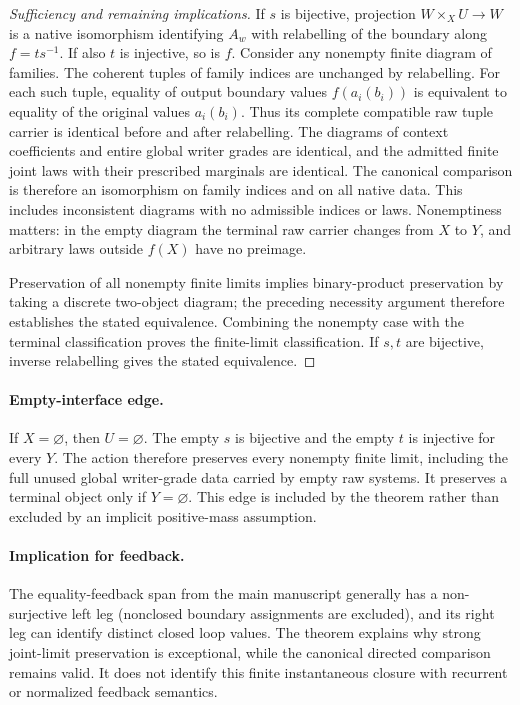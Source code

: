 \documentclass{article}
\begin{document}
\begin{proof}[Sufficiency and remaining implications]
If $s$ is bijective, projection $W\times_XU\to W$ is a native isomorphism
identifying $A_w$ with relabelling of the boundary along $f=ts^{-1}$. If also
$t$ is injective, so is $f$. Consider any nonempty finite diagram of families.
The coherent tuples of family indices are unchanged by relabelling. For each
such tuple, equality of output boundary values $f(a_i(b_i))$ is equivalent
to equality of the original values $a_i(b_i)$. Thus its complete compatible
raw tuple carrier is identical before and after relabelling. The diagrams of
context coefficients and entire global writer grades are identical, and the
admitted finite joint laws with their prescribed marginals are identical.
The canonical comparison is therefore an isomorphism on family indices and
on all native data. This includes inconsistent diagrams with no admissible
indices or laws. Nonemptiness matters: in the empty diagram the terminal raw
carrier changes from $X$ to $Y$, and arbitrary laws outside $f(X)$ have no
preimage.

Preservation of all nonempty finite limits implies binary-product preservation
by taking a discrete two-object diagram; the preceding necessity argument
therefore establishes the stated equivalence. Combining the nonempty case
with the terminal classification proves the finite-limit classification.
If $s,t$ are bijective, inverse relabelling gives the stated equivalence.
\end{proof}

\paragraph{Empty-interface edge.}
If $X=\varnothing$, then $U=\varnothing$. The empty $s$ is bijective and the
empty $t$ is injective for every $Y$. The action therefore preserves every
nonempty finite limit, including the full unused global writer-grade data
carried by empty raw systems. It preserves a terminal object only if
$Y=\varnothing$. This edge is included by the theorem rather than excluded
by an implicit positive-mass assumption.

\paragraph{Implication for feedback.}
The equality-feedback span from the main manuscript generally has a
non-surjective left leg (nonclosed boundary assignments are excluded), and
its right leg can identify distinct closed loop values. The theorem explains
why strong joint-limit preservation is exceptional, while the canonical
directed comparison remains valid. It does not identify this finite
instantaneous closure with recurrent or normalized feedback semantics.
\end{document}
